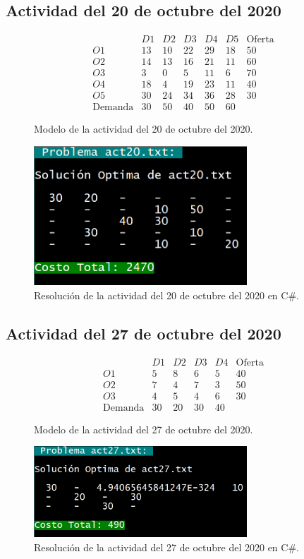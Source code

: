 \documentclass[a4paper, 12pt]{article}
\begin{document}
    \subsection{Actividad del 20 de octubre del 2020}
    \begin{figure}[H]
        \[\begin{matrix}
            &D1&D2&D3&D4&D5&\text{Oferta}\\
          O1&13&10&22&29&18&50\\
          O2&14&13&16&21&11&60\\
          O3&3&0&5&11&6&70\\
          O4&18&4&19&23&11&40\\
          O5&30&24&34&36&28&30\\
          \text{Demanda}&30&50&40&50&60
        \end{matrix}\]
        \caption{Modelo de la actividad del 20 de octubre del 2020.}
    \end{figure}
    \begin{figure}[H]
        \centering
        \includegraphics[width=8cm]{act20.PNG}
        \caption{Resolución de la actividad del 20 de octubre del 2020 en C\#.}
    \end{figure}
    \subsection{Actividad del 27 de octubre del 2020}
    \begin{figure}[H]
        \[\begin{matrix}
            &D1&D2&D3&D4&\text{Oferta}\\
        O1&5&8&6&5&40\\
        O2&7&4&7&3&50\\
        O3&4&5&4&6&30\\
        \text{Demanda}&30&20&30&40
        \end{matrix}\]
        \caption{Modelo de la actividad del 27 de octubre del 2020.}
    \end{figure}
    \begin{figure}[H]
        \centering
        \includegraphics[width=8cm]{act27.PNG}
        \caption{Resolución de la actividad del 27 de octubre del 2020 en C\#.}
    \end{figure}
\end{document}
